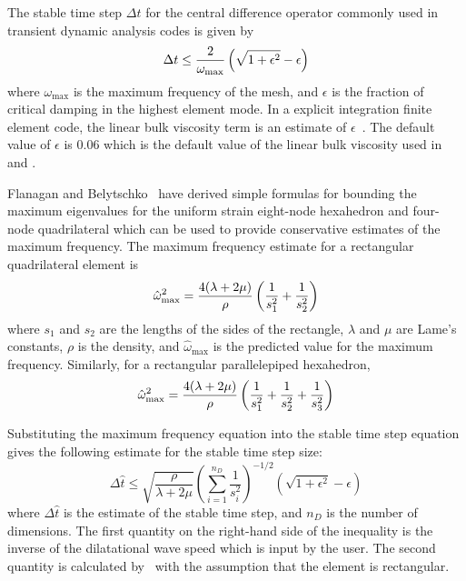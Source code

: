 The stable time step $\Delta t$ for the central difference operator
commonly used in transient dynamic analysis codes is given
by~\cite{Cook}
\begin{equation}
\Delta t \leq {2\over \omega_{\max}} \left(\sqrt{1+\epsilon^2} -
\epsilon\right)
\end{equation}
where $\omega_{\max}$ is the maximum frequency of the mesh, and
$\epsilon$ is the fraction of critical damping in the highest element
mode.  In a explicit integration finite element code, the linear bulk
viscosity term is an estimate of $\epsilon$~\cite{PRONTO2D}. The default
value of $\epsilon$ is 0.06 which is the default value of the linear
bulk viscosity used in  and .

Flanagan and Belytschko~\cite{flanagan} have derived simple
formulas for bounding the maximum eigenvalues for the uniform strain
eight-node hexahedron and four-node quadrilateral which can be used to
provide conservative estimates of the maximum frequency.  The maximum
frequency estimate for a rectangular quadrilateral element is
\begin{equation}
\hat\omega_{\max}^2 = {4(\lambda + 2\mu)\over\rho}\left({1\over s_1^2} +
   {1\over s_2^2}\right)
\end{equation}
where $s_1$ and $s_2$ are the lengths of the sides of the rectangle,
$\lambda$ and $\mu$ are Lame's constants, $\rho$ is the density, and
$\hat\omega_{\max}$ is the predicted value for the maximum frequency.
Similarly, for a rectangular parallelepiped hexahedron,
\begin{equation}
\hat\omega_{\max}^2 = {4(\lambda + 2\mu)\over\rho}\left({1\over s_1^2} +
   {1\over s_2^2}+{1\over s_3^2}\right)
\end{equation}

Substituting the maximum frequency equation into the stable time step
equation gives the following estimate for the stable time step size:
\begin{equation}
\Delta\hat t\le \sqrt{\frac{\rho}{\lambda+2\mu}}
      \left(\sum_{i=1}^{n_D}\frac{1}{s_i^2}\right)^{-1/2}
      \left(\sqrt{1+\epsilon^2} - \epsilon\right)
\end{equation}
where $\Delta\hat t$ is the estimate of the stable time step, and $n_D$
is the number of dimensions.  The first quantity on the right-hand side
of the inequality is the inverse of the dilatational wave speed which is
input by the user.  The second quantity is calculated by \numbers\ with
the assumption that the element is rectangular.

